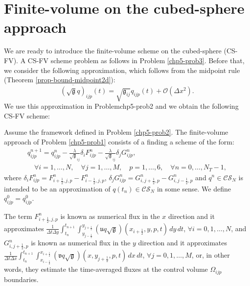 \section{Finite-volume on the cubed-sphere approach}
\label{chp-cs-fvcs}
We are ready to introduce the finite-volume scheme on the cubed-sphere (CS-FV).
A CS-FV scheme problem as follows in Problem \ref{chp5-prob3}.
Before that, we consider the following approximation, which follows from the midpoint rule (Theorem \ref{prop-bound-midpoint2d}):
\begin{equation}
	\label{midpoint-approx}
	\overline{(\sqrt{\mathfrak{g}}q)}_{ijp}(t)  = \sqrt{\mathfrak{g}_{ij}} {q}_{ijp}(t) +\mathcal{O}(\Delta x^2).
\end{equation}
We use this approximation in Problem{chp5-prob2} and we obtain the following CS-FV scheme:
\begin{prob}[CS-FV scheme]
	\label{chp5-prob3}
	Assume the framework defined in Problem \ref{chp5-prob2}.
	The finite-volume approach of Problem \ref{chp5-prob1}
	consists of a finding a scheme of the form:
	\begin{align}
		\label{chp5-csfv}
		{q}_{ijp}^{n+1} =  {q}_{ijp}^{n} - \frac{\lambda}{\sqrt{\mathfrak{g}}_{ij}} \delta_i {F}_{ijp}^{n}
		-  \frac{\lambda}{\sqrt{\mathfrak{g}}_{ij}}  \delta_j {G}_{ijp}^{n},
		\\ \nonumber \quad \forall i = 1, \ldots, N, \quad \forall j = 1, \ldots, M, \quad p =1, \ldots, 6,
		\quad \forall n = 0, \ldots, N_T-1,
	\end{align}
	where $ \delta_i F_{ijp}^n =
	{F}_{i+\frac{1}{2},j,p}^{n} 
	- {F}_{i-\frac{1}{2},j,p}^{n}$,
	$ \delta_j G_{ijp}^n =
	{G}_{i,j+\frac{1}{2},p}^{n} 
	- {G}_{i,j-\frac{1}{2},p}^{n}$ 
	and ${q}^{n}\in \mathcal{CS}_N$ is intended to be an approximation
	of ${q}(t_{n})\in \mathcal{CS}_N$ in some sense. We define
	${q}_{ijp}^{0} = {q}^0_{ijp}$.
	
	The term ${F}_{i+\frac{1}{2}, j, p}^{n}$ is known as numerical flux in the 
	$x$ direction and it approximates
	$\frac{1}{\Delta t \Delta y }\int_{t_n}^{t_{n+1}} 
	\int_{y_{j-\frac{1}{2}}}^{y_{j+\frac{1}{2}}} 
	(\mathfrak{u}q\sqrt{\mathfrak{g}})(x_{i+\frac{1}{2}}, y, p, t) \,dy \,dt $,
	$\forall i = 0, 1, \ldots, N$, and 
	${G}_{i, j+\frac{1}{2}, p}^{n}$ is known as numerical flux in the 
	$y$ direction and it approximates
	$\frac{1}{\Delta t\Delta x}\int_{t_n}^{t_{n+1}}  
	\int_{x_{i-\frac{1}{2}}}^{x_{i+\frac{1}{2}}}
	(\mathfrak{v}q\sqrt{\mathfrak{g}})(x, y_{j+\frac{1}{2}}, p, t) \,dx \,dt $,
	$\forall j = 0, 1, \ldots, M$,
	or, in other words, they estimate the time-averaged
	fluxes at the control volume $\Omega_{ijp}$ boundaries.
\end{prob}
